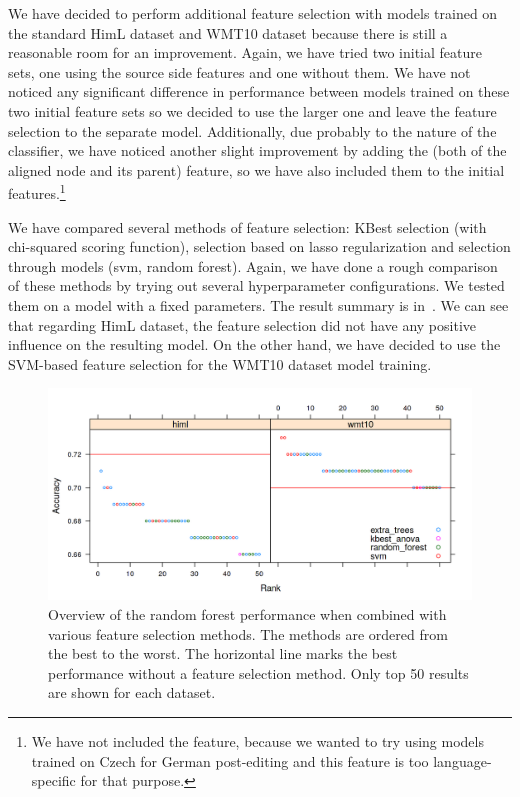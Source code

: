 We have decided to perform additional feature selection with models trained on the standard HimL dataset
and WMT10 dataset because there is still a reasonable room for an improvement. Again, we have tried two initial feature
sets, one using the source side features and one without them. We have not noticed any significant difference in performance
between models trained on these two initial feature sets so we decided to use the larger one and leave
the feature selection to the separate model. Additionally, due probably to the nature of the classifier, we have noticed
another slight improvement by adding the  (both of the aligned node and its parent) feature, so we have also
included them to the initial features.\footnote{We have not included the  feature, because we wanted to
try using models trained on Czech for German post-editing and this feature is too language-specific for that purpose.}

We have compared several methods of feature selection: KBest selection
(with chi-squared scoring function), selection based on lasso regularization and selection through
models (svm, random forest). Again, we have done a rough comparison of these methods by trying out
several hyperparameter configurations. We tested them on a model with a fixed parameters. The result summary
is in~. We can see that regarding HimL dataset, the feature selection did not have
any positive influence on the resulting model. On the other hand, we have decided to use the SVM-based
feature selection for the WMT10 dataset model training.

\begin{figure}
\centering
  \includegraphics[scale=0.7]{cat-sel}
  \caption[Feature selection method comparison - Morphological prediction]{
    Overview of the random forest performance when combined with various feature selection methods.
The methods are ordered from the best to the worst. The horizontal line marks the best performance without
a feature selection method. Only top 50 results are shown for each dataset.
}
  \label{cats-sel}
\end{figure}

